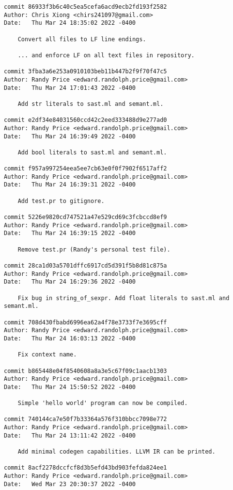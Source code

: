 {\begin{verbatim}
commit 86933f3b6c40c5ea5cefa6acd9ecb2fd193f2582
Author: Chris Xiong <chirs241097@gmail.com>
Date:   Thu Mar 24 18:35:02 2022 -0400

    Convert all files to LF line endings.
    
    ... and enforce LF on all text files in repository.

commit 3fba3a6e253a0910103beb11b447b2f9f70f47c5
Author: Randy Price <edward.randolph.price@gmail.com>
Date:   Thu Mar 24 17:01:43 2022 -0400

    Add str literals to sast.ml and semant.ml.

commit e2df34e84031560ccd42c2eed333488d9e277ad0
Author: Randy Price <edward.randolph.price@gmail.com>
Date:   Thu Mar 24 16:39:49 2022 -0400

    Add bool literals to sast.ml and semant.ml.

commit f957a997254eea5ee7cb63e0f0f7902f6517aff2
Author: Randy Price <edward.randolph.price@gmail.com>
Date:   Thu Mar 24 16:39:31 2022 -0400

    Add test.pr to gitignore.

commit 5226e9820cd747521a47e529cd69c3fcbccd8ef9
Author: Randy Price <edward.randolph.price@gmail.com>
Date:   Thu Mar 24 16:39:15 2022 -0400

    Remove test.pr (Randy's personal test file).

commit 28ca1d03a5701dffc6917cd5d391f5b8d81c875a
Author: Randy Price <edward.randolph.price@gmail.com>
Date:   Thu Mar 24 16:29:36 2022 -0400

    Fix bug in string_of_sexpr. Add float literals to sast.ml and semant.ml.

commit 708d430fbabd6996ea62a4f78e3733f7e3695cff
Author: Randy Price <edward.randolph.price@gmail.com>
Date:   Thu Mar 24 16:03:13 2022 -0400

    Fix context name.

commit b865448e04f8540608a8a3e5c67f09c1aacb1303
Author: Randy Price <edward.randolph.price@gmail.com>
Date:   Thu Mar 24 15:50:52 2022 -0400

    Simple 'hello world' program can now be compiled.

commit 740144ca7e50f7b33364a576f310bbcc7098e772
Author: Randy Price <edward.randolph.price@gmail.com>
Date:   Thu Mar 24 13:11:42 2022 -0400

    Add minimal codegen capabilities. LLVM IR can be printed.

commit 8acf2278dccfcf8d3b5efd43bd903fefda824ee1
Author: Randy Price <edward.randolph.price@gmail.com>
Date:   Wed Mar 23 20:30:37 2022 -0400


\end{verbatim}}
